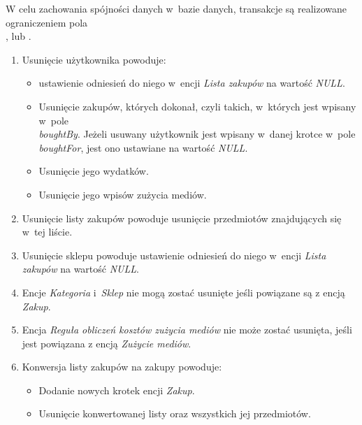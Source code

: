 W celu zachowania spójności danych w~bazie danych, transakcje są realizowane ograniczeniem pola\\\textit{}, \textit{} lub \textit{}.

\begin{enumerate}

  \item Usunięcie użytkownika powoduje:
  \begin{itemize} 
    \item  ustawienie odniesień do niego w~encji \textit{Lista zakupów} na wartość \textit{NULL}.
    \item Usunięcie zakupów, których dokonał, czyli takich, w~których jest wpisany w~pole\\\textit{boughtBy}. Jeżeli usuwany użytkownik jest wpisany w~danej krotce w~pole \textit{boughtFor}, jest ono ustawiane na wartość \textit{NULL}.
    \item Usunięcie jego wydatków.
    \item Usunięcie jego wpisów zużycia mediów.
  \end{itemize}

  \item Usunięcie listy zakupów powoduje usunięcie przedmiotów znajdujących się w~tej liście.

  \item Usunięcie sklepu powoduje ustawienie odniesień do niego w~encji \textit{Lista zakupów} na wartość \textit{NULL}.
  
  \item Encje \textit{Kategoria} i~\textit{Sklep} nie mogą zostać usunięte jeśli powiązane są z encją \textit{Zakup}.

  \item Encja \textit{Reguła obliczeń kosztów zużycia mediów} nie może zostać usunięta, jeśli jest powiązana z encją \textit{Zużycie mediów}.
  
  \item Konwersja listy zakupów na zakupy powoduje:
  \begin{itemize}
    \item Dodanie nowych krotek encji \textit{Zakup}.
    \item Usunięcie konwertowanej listy oraz wszystkich jej przedmiotów.
  \end{itemize}
\end{enumerate}
